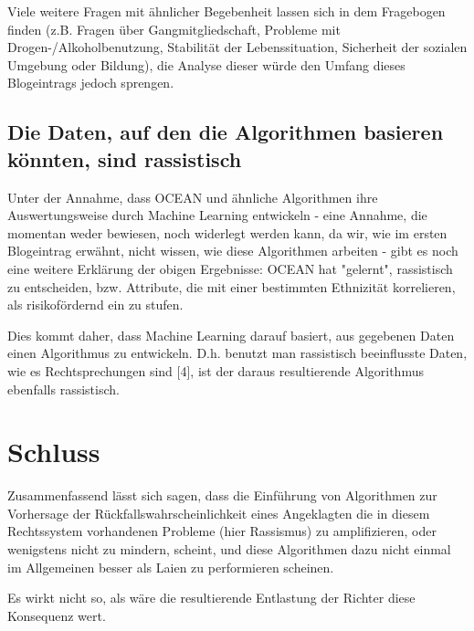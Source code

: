 \documentclass[10pt, a4paper, twocolumn]{article} %
\begin{document}
Viele weitere Fragen mit ähnlicher Begebenheit lassen sich in dem Fragebogen finden (z.B. Fragen über Gangmitgliedschaft, Probleme mit Drogen-/Alkoholbenutzung, Stabilität der Lebenssituation, Sicherheit der sozialen Umgebung oder Bildung), die Analyse dieser würde den Umfang dieses Blogeintrags jedoch sprengen.

\subsection{Die Daten, auf den die Algorithmen basieren könnten, sind rassistisch}
Unter der Annahme, dass OCEAN und ähnliche Algorithmen ihre Auswertungsweise durch Machine Learning entwickeln - eine Annahme, die momentan weder bewiesen, noch widerlegt werden kann, da wir, wie im ersten Blogeintrag erwähnt, nicht wissen, wie diese Algorithmen arbeiten - gibt es noch eine weitere Erklärung der obigen Ergebnisse: OCEAN hat "gelernt", rassistisch zu entscheiden, bzw. Attribute, die mit einer bestimmten Ethnizität korrelieren, als risikofördernd ein zu stufen.

Dies kommt daher, dass Machine Learning darauf basiert, aus gegebenen Daten einen Algorithmus zu entwickeln. D.h. benutzt man rassistisch beeinflusste Daten, wie es Rechtsprechungen sind [4], ist der daraus resultierende Algorithmus ebenfalls rassistisch.

\section{Schluss}
Zusammenfassend lässt sich sagen, dass die Einführung von Algorithmen zur Vorhersage der Rückfallswahrscheinlichkeit eines Angeklagten die in diesem Rechtssystem vorhandenen Probleme (hier Rassismus) zu amplifizieren, oder wenigstens nicht zu mindern, scheint, und diese Algorithmen dazu nicht einmal im Allgemeinen besser als Laien zu performieren scheinen.

Es wirkt nicht so, als wäre die resultierende Entlastung der Richter diese Konsequenz wert.

\end{document}

